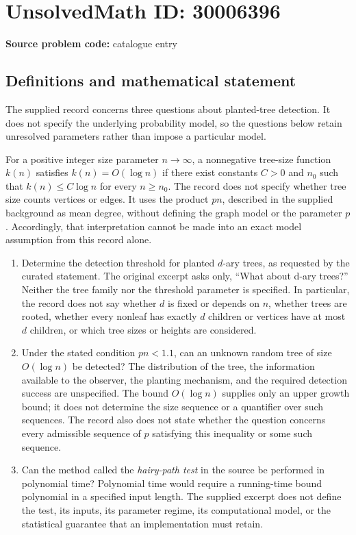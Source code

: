 \documentclass[11pt]{article}
\begin{document}
\section*{UnsolvedMath ID: 30006396}
\textbf{Source problem code:} catalogue entry
\subsection{Definitions and mathematical statement}
The supplied record concerns three questions about planted-tree detection. It does not specify the underlying probability model, so the questions below retain unresolved parameters rather than impose a particular model.

For a positive integer size parameter \(n\to\infty\), a nonnegative tree-size function \(k(n)\) satisfies \(k(n)=O(\log n)\) if there exist constants \(C>0\) and \(n_0\) such that \(k(n)\le C\log n\) for every \(n\ge n_0\). The record does not specify whether tree size counts vertices or edges. It uses the product \(pn\), described in the supplied background as mean degree, without defining the graph model or the parameter \(p\). Accordingly, that interpretation cannot be made into an exact model assumption from this record alone.

\begin{enumerate}
\item Determine the detection threshold for planted \(d\)-ary trees, as requested by the curated statement. The original excerpt asks only, ``What about d-ary trees?'' Neither the tree family nor the threshold parameter is specified. In particular, the record does not say whether \(d\) is fixed or depends on \(n\), whether trees are rooted, whether every nonleaf has exactly \(d\) children or vertices have at most \(d\) children, or which tree sizes or heights are considered.
\item Under the stated condition \(pn<1.1\), can an unknown random tree of size \(O(\log n)\) be detected? The distribution of the tree, the information available to the observer, the planting mechanism, and the required detection success are unspecified. The bound \(O(\log n)\) supplies only an upper growth bound; it does not determine the size sequence or a quantifier over such sequences. The record also does not state whether the question concerns every admissible sequence of \(p\) satisfying this inequality or some such sequence.
\item Can the method called the \emph{hairy-path test} in the source be performed in polynomial time? Polynomial time would require a running-time bound polynomial in a specified input length. The supplied excerpt does not define the test, its inputs, its parameter regime, its computational model, or the statistical guarantee that an implementation must retain.
\end{enumerate}
\end{document}
